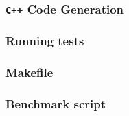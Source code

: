 \subsubsection{\texttt{C++} Code Generation}


\subsubsection{Running tests}


\subsubsection{Makefile}


\subsubsection{Benchmark script}

